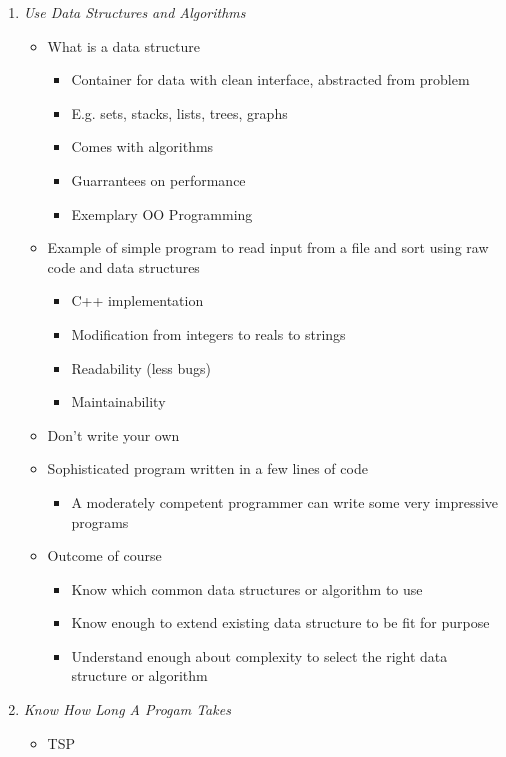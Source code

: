 \documentclass{article}
\begin{document}
\begin{enumerate}
\item \emph{Use Data Structures and Algorithms}
  \begin{itemize}
  \item What is a data structure
    \begin{itemize}
    \item Container for data with clean interface, abstracted from
      problem
    \item E.g. sets, stacks, lists, trees, graphs
    \item Comes with algorithms
    \item Guarrantees on performance
    \item Exemplary OO Programming
    \end{itemize}
  \item Example of simple program to read input from a file and sort
    using raw code and data structures
    \begin{itemize}
    \item C++ implementation
    \item Modification from integers to reals to strings
    \item Readability (less bugs)
    \item Maintainability
    \end{itemize}
  \item Don't write your own
  \item Sophisticated program written in a few lines of code
    \begin{itemize}
    \item A moderately competent programmer can write some very
      impressive programs
    \end{itemize}
  \item Outcome of course
    \begin{itemize}
    \item Know which common data structures or algorithm to use
    \item Know enough to extend existing data structure to be fit for
      purpose
    \item Understand enough about complexity to select the right data
      structure or algorithm
    \end{itemize}
  \end{itemize}
\item \emph{Know How Long A Progam Takes}
  \begin{itemize}
  \item TSP

\end{itemize}
\end{enumerate}
\end{document}
